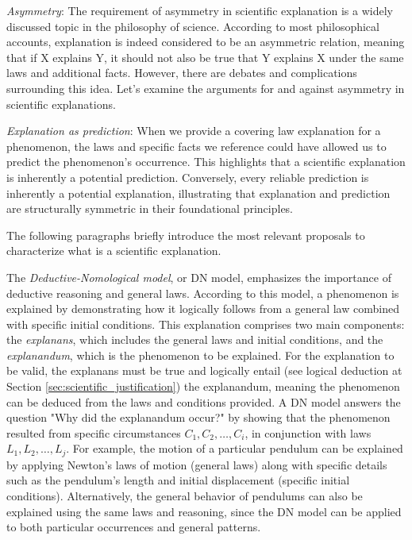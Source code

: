 \emph{Asymmetry}: The requirement of asymmetry in scientific explanation is a widely discussed topic in the philosophy of science. According to most philosophical accounts, explanation is indeed considered to be an asymmetric relation, meaning that if X explains Y, it should not also be true that Y explains  X under the same laws and additional facts. However, there are debates and complications surrounding this idea. Let’s examine the arguments for and against asymmetry in scientific explanations.

\emph{Explanation as prediction}: When we provide a covering law explanation for a phenomenon, the laws and specific facts we reference could have allowed us to predict the phenomenon's occurrence. This highlights that a scientific explanation is inherently a potential prediction. Conversely, every reliable prediction is inherently a potential explanation, illustrating that explanation and prediction are structurally symmetric in their foundational principles.

The following paragraphs briefly introduce the most relevant proposals to characterize what is a scientific explanation.

The \emph{Deductive-Nomological model}, or DN model, emphasizes the importance of deductive reasoning and general laws. According to this model, a phenomenon is explained by demonstrating how it logically follows from a general law combined with specific initial conditions. This explanation comprises two main components: the \emph{explanans}, which includes the general laws and initial conditions, and the \emph{explanandum}, which is the phenomenon to be explained. For the explanation to be valid, the explanans must be true and logically entail (see logical deduction at Section \ref{sec:scientific_justification}) the explanandum, meaning the phenomenon can be deduced from the laws and conditions provided. A DN model answers the question "Why did the explanandum occur?" by showing that the phenomenon resulted from specific circumstances $C_1, C_2, \ldots, C_i$, in conjunction with laws $L_1, L_2, \ldots, L_j$. For example, the motion of a particular pendulum can be explained by applying Newton's laws of motion (general laws) along with specific details such as the pendulum's length and initial displacement (specific initial conditions). Alternatively, the general behavior of pendulums can also be explained using the same laws and reasoning, since the DN model can be applied to both particular occurrences and general patterns.

